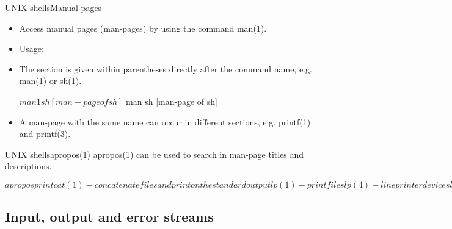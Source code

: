 \documentclass[handout]{beamer}
\begin{document}
\begin{frame}[fragile]{UNIX shells}{Manual pages}
	\begin{itemize}
		\item<1-2> Access manual pages (man-pages) by using the command man(1).

		\item<2> Usage: 

		\item<3> The section is given within parentheses directly after the command 
			name, e.g. man(1) or sh(1).
      \begin{terminal}
$ man 1 sh
[man-page of sh]
$ man sh
[man-page of sh]
      \end{terminal}

		\item<4> A man-page with the same name can occur in different sections, 
			e.g. printf(1) and printf(3).

	\end{itemize}
\end{frame}

\begin{frame}[fragile]{UNIX shells}{apropos(1)}
	apropos(1) can be used to search in man-page titles and descriptions.
	\small
  \begin{terminal}
$ apropos print
cat (1)              - concatenate files and print on the standard output
lp (1)               - print files
lp (4)               - line printer devices
lpq (1)              - show printer queue status
lpr (1)              - print files
lprm (1)             - cancel print jobs
lpstat (1)           - print cups status information
printf (1)           - format and print data
printf (3)           - formatted output conversion
whoami (1)           - print effective userid
$
  \end{terminal}
\end{frame}

\subsection{Input, output and error streams}
\end{document}

